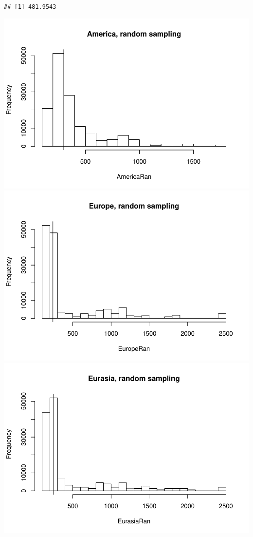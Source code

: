 \documentclass[]{article}
\begin{document}
\begin{verbatim}
## [1] 481.9543
\end{verbatim}

\includegraphics{MA_JJ_files/figure-latex/randon sampling continents-1.pdf}
\includegraphics{MA_JJ_files/figure-latex/randon sampling continents-2.pdf}
\includegraphics{MA_JJ_files/figure-latex/randon sampling continents-3.pdf}
\end{document}
